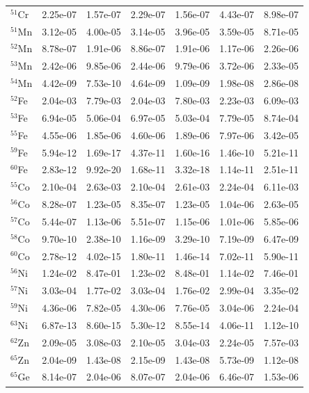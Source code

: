 \begin{table}
\begin{tabular}{l|cc|cc|cc}
$^{51}$Cr & 2.25e-07 & 1.57e-07 & 2.29e-07 & 1.56e-07 & 4.43e-07 & 8.98e-07\\
$^{51}$Mn & 3.12e-05 & 4.00e-05 & 3.14e-05 & 3.96e-05 & 3.59e-05 & 8.71e-05\\
$^{52}$Mn & 8.78e-07 & 1.91e-06 & 8.86e-07 & 1.91e-06 & 1.17e-06 & 2.26e-06\\
$^{53}$Mn & 2.42e-06 & 9.85e-06 & 2.44e-06 & 9.79e-06 & 3.72e-06 & 2.33e-05\\
$^{54}$Mn & 4.42e-09 & 7.53e-10 & 4.64e-09 & 1.09e-09 & 1.98e-08 & 2.86e-08\\
$^{52}$Fe & 2.04e-03 & 7.79e-03 & 2.04e-03 & 7.80e-03 & 2.23e-03 & 6.09e-03\\
$^{53}$Fe & 6.94e-05 & 5.06e-04 & 6.97e-05 & 5.03e-04 & 7.79e-05 & 8.74e-04\\
$^{55}$Fe & 4.55e-06 & 1.85e-06 & 4.60e-06 & 1.89e-06 & 7.97e-06 & 3.42e-05\\
$^{59}$Fe & 5.94e-12 & 1.69e-17 & 4.37e-11 & 1.60e-16 & 1.46e-10 & 5.21e-11\\
$^{60}$Fe & 2.83e-12 & 9.92e-20 & 1.68e-11 & 3.32e-18 & 1.14e-11 & 2.51e-11\\
$^{55}$Co & 2.10e-04 & 2.63e-03 & 2.10e-04 & 2.61e-03 & 2.24e-04 & 6.11e-03\\
$^{56}$Co & 8.28e-07 & 1.23e-05 & 8.35e-07 & 1.23e-05 & 1.04e-06 & 2.63e-05\\
$^{57}$Co & 5.44e-07 & 1.13e-06 & 5.51e-07 & 1.15e-06 & 1.01e-06 & 5.85e-06\\
$^{58}$Co & 9.70e-10 & 2.38e-10 & 1.16e-09 & 3.29e-10 & 7.19e-09 & 6.47e-09\\
$^{60}$Co & 2.78e-12 & 4.02e-15 & 1.80e-11 & 1.46e-14 & 7.02e-11 & 5.90e-11\\
$^{56}$Ni & 1.24e-02 & 8.47e-01 & 1.23e-02 & 8.48e-01 & 1.14e-02 & 7.46e-01\\
$^{57}$Ni & 3.03e-04 & 1.77e-02 & 3.03e-04 & 1.76e-02 & 2.99e-04 & 3.35e-02\\
$^{59}$Ni & 4.36e-06 & 7.82e-05 & 4.30e-06 & 7.76e-05 & 3.04e-06 & 2.24e-04\\
$^{63}$Ni & 6.87e-13 & 8.60e-15 & 5.30e-12 & 8.55e-14 & 4.06e-11 & 1.12e-10\\
$^{62}$Zn & 2.09e-05 & 3.08e-03 & 2.10e-05 & 3.04e-03 & 2.24e-05 & 7.57e-03\\
$^{65}$Zn & 2.04e-09 & 1.43e-08 & 2.15e-09 & 1.43e-08 & 5.73e-09 & 1.12e-08\\
$^{65}$Ge & 8.14e-07 & 2.04e-06 & 8.07e-07 & 2.04e-06 & 6.46e-07 & 1.53e-06\\
\hline
\end{tabular}
\end{table}
\newpage
